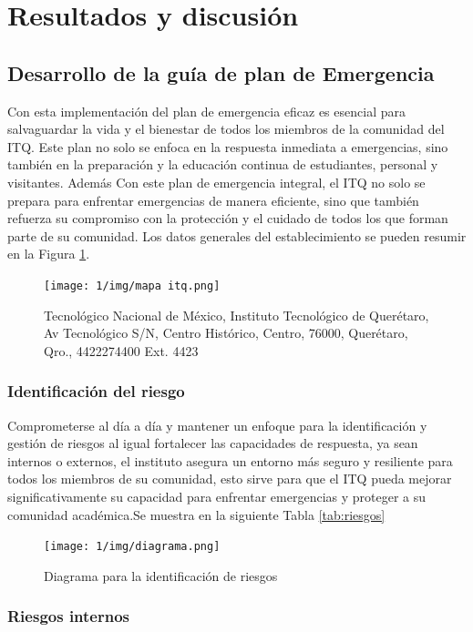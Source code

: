     \section{Resultados y discusión}
    
    \subsection{Desarrollo de la guía de plan de Emergencia}
    
    Con esta implementación del plan de emergencia eficaz es esencial para salvaguardar la vida y el bienestar de todos los miembros de la comunidad del ITQ. Este plan no solo se enfoca en la respuesta inmediata a emergencias, sino también en la preparación y la educación continua de estudiantes, personal y visitantes. Además Con este plan de emergencia integral, el ITQ no solo se prepara para enfrentar emergencias de manera eficiente, sino que también refuerza su compromiso con la protección y el cuidado de todos los que forman parte de su comunidad.
    Los datos generales del establecimiento se pueden resumir en la Figura \ref{fig:mapa itq}.
    \begin{figure}[H]
        \centering
        \texttt{[image: 1/img/mapa itq.png]}
        \caption{Tecnológico Nacional de México, Instituto Tecnológico de Querétaro, Av Tecnológico S/N, Centro Histórico, Centro, 76000, Querétaro, Qro., 4422274400 Ext. 4423}
        \label{fig:mapa itq}
    \end{figure}
    \subsubsection{Identificación del riesgo}
    Comprometerse al día a día y mantener un enfoque para la identificación y gestión de riesgos al igual fortalecer las capacidades de respuesta, ya sean internos o externos, el instituto asegura un entorno más seguro y resiliente para todos los miembros de su comunidad, esto sirve para que el ITQ pueda mejorar significativamente su capacidad para enfrentar emergencias y proteger a su comunidad académica.Se muestra en la siguiente Tabla \ref{tab:riesgos}
    \begin{figure}[H]
        \centering
        \texttt{[image: 1/img/diagrama.png]}
        \caption{Diagrama para la identificación de riesgos}
        \label{fig:diagrama}
    \end{figure}
    \subsubsection{Riesgos internos}
    
